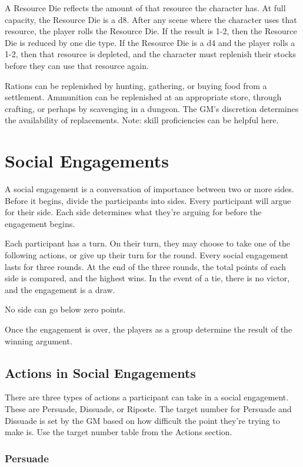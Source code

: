 \begin{multicols}{2}
A Resource Die reflects the amount of that resource the character has. At full capacity, the
Resource Die is a d8. After any scene where the character uses that resource, the player rolls
the Resource Die. If the result is 1-2, then the Resource Die is reduced by one die type. If
the Resource Die is a d4 and the player rolls a 1-2, then that resource is depleted, and the character
must replenish their stocks before they can use that resource again.

Rations can be replenished by hunting, gathering, or buying food from a settlement. Ammunition
can be replenished at an appropriate store, through crafting, or perhaps by scavenging in a dungeon. The GM's discretion
determines the availability of replacements. Note: skill proficiencies can be helpful here.

\section{Social Engagements}

A social engagement is a conversation of importance between two or more sides. Before it begins,
divide the participants into sides. Every participant will argue for their side. Each side
determines what they're arguing for before the engagement begins.

Each participant has a turn. On their turn, they may choose to take one of the
following actions, or give up their turn for the round. Every social engagement
lasts for three rounds. At the end of the three rounds, the total points of each
side is compared, and the highest wins. In the event of a tie, there is no
victor, and the engagement is a draw.

No side can go below zero points.

Once the engagement is over, the players as a group determine the result of the winning argument.

\subsection{Actions in Social Engagements}

There are three types of actions a participant can take in a social engagement.
These are Persuade, Dissuade, or Riposte. The target number for Persuade and
Dissuade is set by the GM based on how difficult the point they're trying to
make is. Use the target number table from the Actions section.

\subsubsection{Persuade}


\end{multicols}
